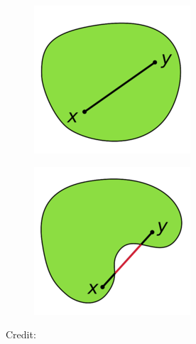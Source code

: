 \documentclass[10pt,a4paper]{report}
\begin{document}
\begin{figure}[h!!]
        \centering
\begin{subfigure}[b]{0.4\textwidth}
\includegraphics[width=\textwidth]{imgs/convex.png}


\end{subfigure}
\begin{subfigure}[b]{0.4\textwidth}
\includegraphics[width=\textwidth]{imgs/notconvex.png}

\end{subfigure}

\hspace*{15pt}\hbox{\scriptsize Credit:}
\end{figure}
\end{document}
